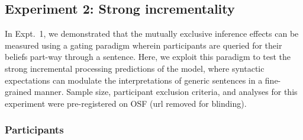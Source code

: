 \documentclass[10pt,letterpaper]{article}
\begin{document}
%
%







\subsection{Experiment 2: Strong incrementality}

In Expt.~1, we demonstrated that the mutually exclusive inference effects can be measured using a gating paradigm wherein participants are queried for their beliefs part-way through a sentence. 
Here, we exploit this paradigm to test the strong incremental processing predictions of the model, where syntactic expectations can modulate the interpretations of generic sentences in a fine-grained manner. 
Sample size, participant exclusion criteria, and analyses for this experiment were pre-registered on OSF (url removed for blinding).

\subsubsection{Participants}
\end{document}
